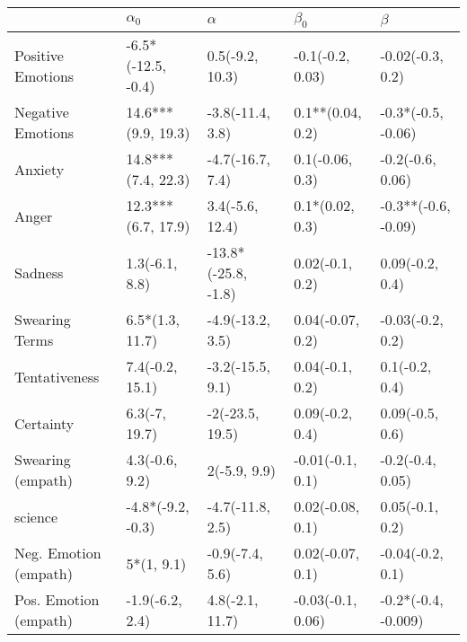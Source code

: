 \begin{tabular}{lllll}
\toprule
{} &          $\alpha_0$ &             $\alpha$ &          $\beta_0$ &              $\beta$ \\
\midrule
Positive Emotions     &  -6.5*(-12.5, -0.4) &      0.5(-9.2, 10.3) &   -0.1(-0.2, 0.03) &     -0.02(-0.3, 0.2) \\
Negative Emotions     &  14.6***(9.9, 19.3) &     -3.8(-11.4, 3.8) &   0.1**(0.04, 0.2) &   -0.3*(-0.5, -0.06) \\
Anxiety               &  14.8***(7.4, 22.3) &     -4.7(-16.7, 7.4) &    0.1(-0.06, 0.3) &     -0.2(-0.6, 0.06) \\
Anger                 &  12.3***(6.7, 17.9) &      3.4(-5.6, 12.4) &    0.1*(0.02, 0.3) &  -0.3**(-0.6, -0.09) \\
Sadness               &      1.3(-6.1, 8.8) &  -13.8*(-25.8, -1.8) &    0.02(-0.1, 0.2) &      0.09(-0.2, 0.4) \\
Swearing Terms        &     6.5*(1.3, 11.7) &     -4.9(-13.2, 3.5) &   0.04(-0.07, 0.2) &     -0.03(-0.2, 0.2) \\
Tentativeness         &     7.4(-0.2, 15.1) &     -3.2(-15.5, 9.1) &    0.04(-0.1, 0.2) &       0.1(-0.2, 0.4) \\
Certainty             &       6.3(-7, 19.7) &      -2(-23.5, 19.5) &    0.09(-0.2, 0.4) &      0.09(-0.5, 0.6) \\
Swearing (empath)     &      4.3(-0.6, 9.2) &         2(-5.9, 9.9) &   -0.01(-0.1, 0.1) &     -0.2(-0.4, 0.05) \\
science               &   -4.8*(-9.2, -0.3) &     -4.7(-11.8, 2.5) &   0.02(-0.08, 0.1) &      0.05(-0.1, 0.2) \\
Neg. Emotion (empath) &          5*(1, 9.1) &      -0.9(-7.4, 5.6) &   0.02(-0.07, 0.1) &     -0.04(-0.2, 0.1) \\
Pos. Emotion (empath) &     -1.9(-6.2, 2.4) &      4.8(-2.1, 11.7) &  -0.03(-0.1, 0.06) &  -0.2*(-0.4, -0.009) \\
\bottomrule
\end{tabular}
